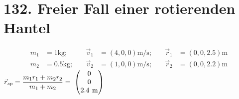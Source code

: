 \documentclass{alex_hü}
\begin{document}
\renewcommand{\labelenumi}{\alph{enumi})}


\section*{132. Freier Fall einer rotierenden Hantel}
\begin{align*}
	m_1 &= 1 \unit{\kg};\quad &\vec{v}_1 &= \left(4, 0, 0\right) \unit{\m\per\s};\quad &\vec{r}_1 &= \left(0, 0, 2.5\right)\unit{\m}  \\
	m_2 &= 0.5 \unit{\kg};\quad  &\vec{v}_2 &= \left(1, 0, 0\right)\unit{\m\per\s};\quad &\vec{r}_2 &= \left(0, 0, 2.2\right)\unit{\m} 
\end{align*}
	\centering \( \vec{r}_{sp} = \dfrac{m_1r_1 + m_2r_2}{m_1 + m_2} = \vector{0\\ 0\\ 2.4\unit{\m}}\) \\
	
\end{document}
